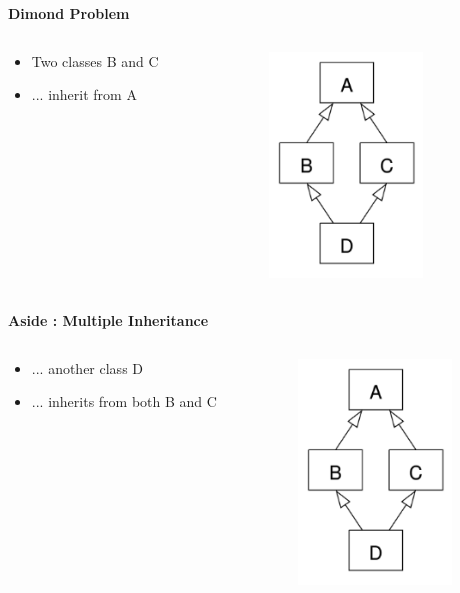 \documentclass{beamer}
\begin{document}
\begin{frame}
\begin{center}
\textbf{Dimond Problem}
\end{center}
\begin{columns}
\begin{column}{0.6\textwidth}
\begin{itemize}
\item Two classes B and C
\item ... inherit from A
\end{itemize}
\end{column}
\begin{column}{0.4\textwidth}
\includegraphics[height=6cm, keepaspectratio]{images/diamond}
\end{column}
\end{columns}
\end{frame}

\begin{frame}
\begin{center}
\textbf{Aside : Multiple Inheritance}
\end{center}
\begin{columns}
\begin{column}{0.6\textwidth}
\begin{itemize}
\item ... another class D 
\item ... inherits from both B and C
\end{itemize}
\end{column}
\begin{column}{0.4\textwidth}
\includegraphics[height=6cm, keepaspectratio]{images/diamond}
\end{column}
\end{columns}
\end{frame}
\end{document}
